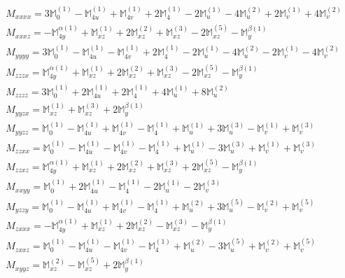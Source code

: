 \documentclass[fleqn,8pt,landscape]{jsarticle}
\begin{document}
\begin{align*}
& M_{xxxx} = 3 \mathbb{M}_{0}^{(1)} - \mathbb{M}_{4u}^{(1)} + \mathbb{M}_{4v}^{(1)} + 2 \mathbb{M}_{4}^{(1)} - 2 \mathbb{M}_{u}^{(1)} - 4 \mathbb{M}_{u}^{(2)} + 2 \mathbb{M}_{v}^{(1)} + 4 \mathbb{M}_{v}^{(2)} \\
& M_{xxxz} = - \mathbb{M}_{4y}^{\alpha(1)} + \mathbb{M}_{xz}^{(1)} + 2 \mathbb{M}_{xz}^{(2)} + \mathbb{M}_{xz}^{(3)} - 2 \mathbb{M}_{xz}^{(5)} - \mathbb{M}_{y}^{\beta(1)} \\
& M_{yyyy} = 3 \mathbb{M}_{0}^{(1)} - \mathbb{M}_{4u}^{(1)} - \mathbb{M}_{4v}^{(1)} + 2 \mathbb{M}_{4}^{(1)} - 2 \mathbb{M}_{u}^{(1)} - 4 \mathbb{M}_{u}^{(2)} - 2 \mathbb{M}_{v}^{(1)} - 4 \mathbb{M}_{v}^{(2)} \\
& M_{zzzx} = \mathbb{M}_{4y}^{\alpha(1)} + \mathbb{M}_{xz}^{(1)} + 2 \mathbb{M}_{xz}^{(2)} + \mathbb{M}_{xz}^{(3)} - 2 \mathbb{M}_{xz}^{(5)} - \mathbb{M}_{y}^{\beta(1)} \\
& M_{zzzz} = 3 \mathbb{M}_{0}^{(1)} + 2 \mathbb{M}_{4u}^{(1)} + 2 \mathbb{M}_{4}^{(1)} + 4 \mathbb{M}_{u}^{(1)} + 8 \mathbb{M}_{u}^{(2)} \\
& M_{yyzx} = \mathbb{M}_{xz}^{(1)} + \mathbb{M}_{xz}^{(3)} + 2 \mathbb{M}_{y}^{\beta(1)} \\
& M_{yyzz} = \mathbb{M}_{0}^{(1)} - \mathbb{M}_{4u}^{(1)} + \mathbb{M}_{4v}^{(1)} - \mathbb{M}_{4}^{(1)} + \mathbb{M}_{u}^{(1)} + 3 \mathbb{M}_{u}^{(3)} - \mathbb{M}_{v}^{(1)} + \mathbb{M}_{v}^{(3)} \\
& M_{zzxx} = \mathbb{M}_{0}^{(1)} - \mathbb{M}_{4u}^{(1)} - \mathbb{M}_{4v}^{(1)} - \mathbb{M}_{4}^{(1)} + \mathbb{M}_{u}^{(1)} - 3 \mathbb{M}_{u}^{(3)} + \mathbb{M}_{v}^{(1)} + \mathbb{M}_{v}^{(3)} \\
& M_{zzxz} = \mathbb{M}_{4y}^{\alpha(1)} + \mathbb{M}_{xz}^{(1)} + 2 \mathbb{M}_{xz}^{(2)} + \mathbb{M}_{xz}^{(3)} + 2 \mathbb{M}_{xz}^{(5)} - \mathbb{M}_{y}^{\beta(1)} \\
& M_{xxyy} = \mathbb{M}_{0}^{(1)} + 2 \mathbb{M}_{4u}^{(1)} - \mathbb{M}_{4}^{(1)} - 2 \mathbb{M}_{u}^{(1)} - 2 \mathbb{M}_{v}^{(3)} \\
& M_{yzzy} = \mathbb{M}_{0}^{(1)} - \mathbb{M}_{4u}^{(1)} + \mathbb{M}_{4v}^{(1)} - \mathbb{M}_{4}^{(1)} + \mathbb{M}_{u}^{(2)} + 3 \mathbb{M}_{u}^{(5)} - \mathbb{M}_{v}^{(2)} + \mathbb{M}_{v}^{(5)} \\
& M_{zxxx} = - \mathbb{M}_{4y}^{\alpha(1)} + \mathbb{M}_{xz}^{(1)} + 2 \mathbb{M}_{xz}^{(2)} - \mathbb{M}_{xz}^{(3)} - \mathbb{M}_{y}^{\beta(1)} \\
& M_{zxxz} = \mathbb{M}_{0}^{(1)} - \mathbb{M}_{4u}^{(1)} - \mathbb{M}_{4v}^{(1)} - \mathbb{M}_{4}^{(1)} + \mathbb{M}_{u}^{(2)} - 3 \mathbb{M}_{u}^{(5)} + \mathbb{M}_{v}^{(2)} + \mathbb{M}_{v}^{(5)} \\
& M_{xyyz} = \mathbb{M}_{xz}^{(2)} - \mathbb{M}_{xz}^{(5)} + 2 \mathbb{M}_{y}^{\beta(1)}
\end{align*}
\end{document}
